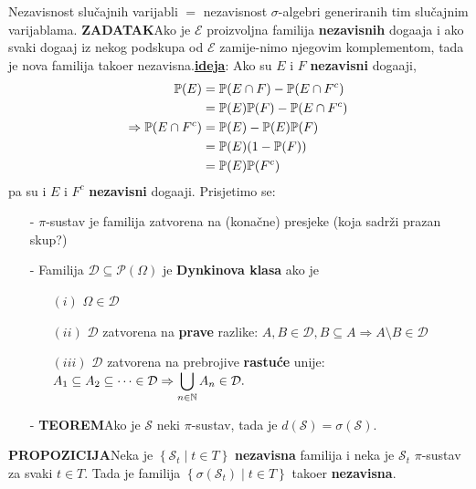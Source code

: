 \documentclass{article}
\begin{document}
Nezavisnost slučajnih varijabli \(=\) nezavisnost \(\sigma\)-algebri generiranih tim slučajnim varijablama.\newline\newline
\textbf{ZADATAK}\newline Ako je \(\mathcal E\) proizvoljna familija \textbf{nezavisnih} doga\dj{}aja i ako svaki doga\dj{}aj iz nekog podskupa od \(\mathcal E\) zamije-\newline nimo njegovim komplementom, tada je nova familija tako\dj{}er nezavisna.\newline\textbf{\underline{ideja}}: Ako su \(E\) i \(F\) \textbf{nezavisni} doga\dj{}aji, \[\begin{aligned}\Bbb P(E)&=\Bbb P(E\cap F)-\Bbb P(E\cap F^c)\\&=\Bbb P(E)\Bbb P(F)-\Bbb P(E\cap F^c)\\\Rightarrow\Bbb P(E\cap F^c)&=\Bbb P(E)-\Bbb P(E)\Bbb P(F)\\&=\Bbb P(E)(1-\Bbb P(F))\\&=\Bbb P(E)\Bbb P(F^c)\end{aligned}\] pa su i \(E\) i \(F^c\) \textbf{nezavisni} doga\dj{}aji.\newline\newline  
Prisjetimo se: 
\begin{itemize}
    \item[-] \(\pi\)-sustav je familija zatvorena na (konačne) presjeke (koja sadrži prazan skup?)
    \item[-] Familija \(\mathcal D\subseteq\mathcal P(\Omega)\) je \textbf{Dynkinova klasa} ako je \begin{enumerate}
        \item[\((i)\)] \(\Omega\in\mathcal D\)
        \item[\((ii)\)] \(\mathcal D\) zatvorena na \textbf{prave} razlike: \(A,B\in\mathcal D,B\subseteq A\Rightarrow A\setminus B\in\mathcal D\)
        \item[\((iii)\)] \(\mathcal D\) zatvorena na prebrojive \textbf{rastuće} unije: \(A_1\subseteq A_2\subseteq\cdots\in\mathcal D\Rightarrow\displaystyle\bigcup_{n\in\Bbb N}A_n\in\mathcal D.\) 
    \end{enumerate}
    \item[-]\textbf{TEOREM}\newline Ako je \(\mathcal S\) neki \(\pi\)-sustav, tada je \(d(\mathcal S)=\sigma(\mathcal S).\)
\end{itemize}
\textbf{PROPOZICIJA}\newline Neka je \(\left\{\mathcal S_t\mid t\in T\right\}\) \textbf{nezavisna} familija i neka je \(\mathcal S_t\) \(\pi\)-sustav za svaki \(t\in T.\) Tada je familija \(\left\{\sigma(\mathcal S_t)\mid t\in T\right\}\) tako\dj{}er \textbf{nezavisna}.\newline\newline
\end{document}
